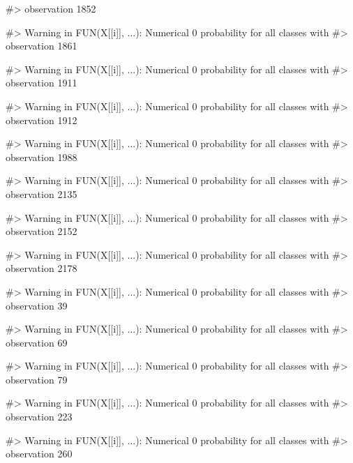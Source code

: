 \begin{Schunk}
\begin{Soutput}
#> observation 1852
\end{Soutput}
\begin{Soutput}
#> Warning in FUN(X[[i]], ...): Numerical 0 probability for all classes with
#> observation 1861
\end{Soutput}
\begin{Soutput}
#> Warning in FUN(X[[i]], ...): Numerical 0 probability for all classes with
#> observation 1911
\end{Soutput}
\begin{Soutput}
#> Warning in FUN(X[[i]], ...): Numerical 0 probability for all classes with
#> observation 1912
\end{Soutput}
\begin{Soutput}
#> Warning in FUN(X[[i]], ...): Numerical 0 probability for all classes with
#> observation 1988
\end{Soutput}
\begin{Soutput}
#> Warning in FUN(X[[i]], ...): Numerical 0 probability for all classes with
#> observation 2135
\end{Soutput}
\begin{Soutput}
#> Warning in FUN(X[[i]], ...): Numerical 0 probability for all classes with
#> observation 2152
\end{Soutput}
\begin{Soutput}
#> Warning in FUN(X[[i]], ...): Numerical 0 probability for all classes with
#> observation 2178
\end{Soutput}
\begin{Soutput}
#> Warning in FUN(X[[i]], ...): Numerical 0 probability for all classes with
#> observation 39
\end{Soutput}
\begin{Soutput}
#> Warning in FUN(X[[i]], ...): Numerical 0 probability for all classes with
#> observation 69
\end{Soutput}
\begin{Soutput}
#> Warning in FUN(X[[i]], ...): Numerical 0 probability for all classes with
#> observation 79
\end{Soutput}
\begin{Soutput}
#> Warning in FUN(X[[i]], ...): Numerical 0 probability for all classes with
#> observation 223
\end{Soutput}
\begin{Soutput}
#> Warning in FUN(X[[i]], ...): Numerical 0 probability for all classes with
#> observation 260
\end{Soutput}
\begin{Soutput}

\end{Soutput}
\end{Schunk}
